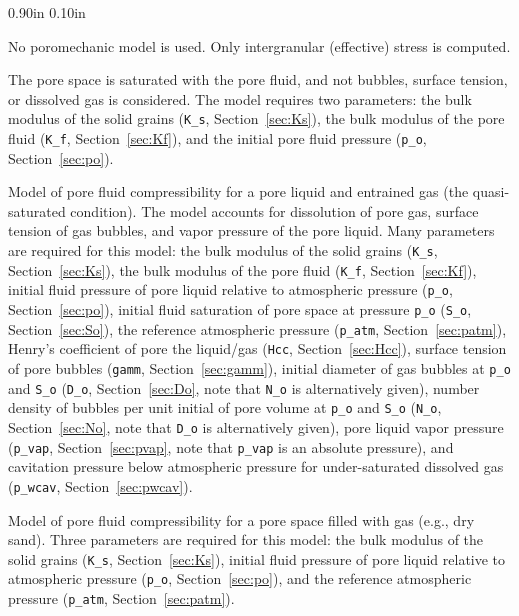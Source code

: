 \documentclass[letterpaper,11pt]{article}
\newlength{\Labelwidth}
\newcommand{\Entrylabel}[1]{\makebox[\Labelwidth][r]{\texttt{#1}}}
\newenvironment{Options}
{\begin{list}{}{%
\renewcommand{\makelabel}{\Entrylabel}%
\setlength{\leftmargin} {0.90in}%
\setlength{\rightmargin}{0.00in}%
\setlength{\labelsep}   {0.10in}%
\setlength{\labelwidth} {\Labelwidth}%
}}
{\end{list}}
\begin{document}
\begin{Options}
  \item[iporo=0]
  No poromechanic model is used.
  Only intergranular (effective) stress is computed.
  \item[iporo=1]
  The pore space is saturated with the pore fluid,
  and not bubbles, surface tension, or dissolved gas
  is considered.
  The model requires two parameters:
  the bulk modulus of the solid grains
  (\texttt{K\_s}, Section~\ref{sec:Ks}),
  the bulk modulus of the pore fluid
  (\texttt{K\_f}, Section~\ref{sec:Kf}),
  and the initial pore fluid pressure
  (\texttt{p\_o}, Section~\ref{sec:po}).
  \item[iporo=3]
  Model of pore fluid compressibility for
  a pore liquid and entrained gas (the quasi-saturated condition).
  The model accounts for dissolution
  of pore gas, surface tension of gas bubbles,
  and vapor pressure of the pore liquid.
  Many parameters are required for this model:
  the bulk modulus of the solid grains
  (\texttt{K\_s}, Section~\ref{sec:Ks}),
  the bulk modulus of the pore fluid
  (\texttt{K\_f}, Section~\ref{sec:Kf}),
  initial fluid pressure of pore liquid relative to
  atmospheric pressure
  (\texttt{p\_o}, Section~\ref{sec:po}),
  initial fluid saturation of pore space at pressure \texttt{p\_o}
  (\texttt{S\_o}, Section~\ref{sec:So}),
  the reference atmospheric pressure
  (\texttt{p\_atm}, Section~\ref{sec:patm}),
  Henry's coefficient of pore the liquid/gas
  (\texttt{Hcc}, Section~\ref{sec:Hcc}),
  surface tension of pore bubbles
  (\texttt{gamm}, Section~\ref{sec:gamm}),
  initial diameter of gas bubbles
  at \texttt{p\_o} and \texttt{S\_o}
  (\texttt{D\_o}, Section~\ref{sec:Do}, note that
  \texttt{N\_o} is alternatively given),
  number density of bubbles per unit initial of pore volume
  at \texttt{p\_o} and \texttt{S\_o}
  (\texttt{N\_o}, Section~\ref{sec:No}, note that
  \texttt{D\_o} is alternatively given),
  pore liquid vapor pressure 
  (\texttt{p\_vap}, Section~\ref{sec:pvap},
  note that \texttt{p\_vap} is an absolute pressure),
  and cavitation pressure below atmospheric 
  pressure for under-saturated dissolved gas
  (\texttt{p\_wcav}, Section~\ref{sec:pwcav}).
  \item[iporo=4]
  Model of pore fluid compressibility for
  a pore space filled with gas (e.g., dry sand).
  Three parameters are required for this model:
  the bulk modulus of the solid grains
  (\texttt{K\_s}, Section~\ref{sec:Ks}),
  initial fluid pressure of pore liquid relative to
  atmospheric pressure
  (\texttt{p\_o}, Section~\ref{sec:po}), and
  the reference atmospheric pressure
  (\texttt{p\_atm}, Section~\ref{sec:patm}).
\end{Options}
%
\end{document}
